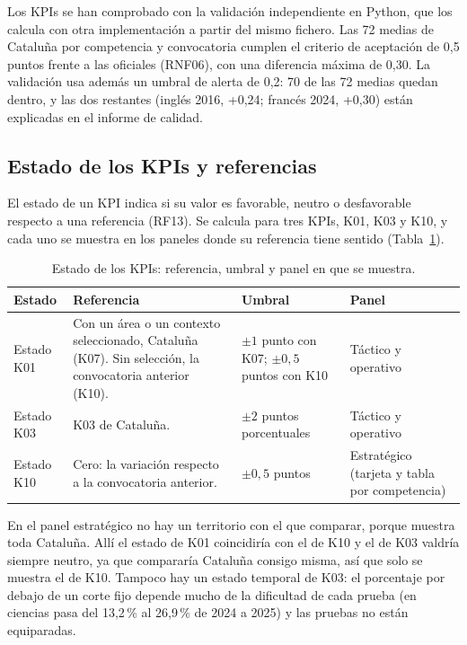 \documentclass[12pt, a4paper, oneside]{report}
\begin{document}
Los KPIs se han comprobado con la validación independiente en Python, que los calcula con otra implementación a partir del mismo fichero. Las 72 medias de Cataluña por competencia y convocatoria cumplen el criterio de aceptación de 0,5 puntos frente a las oficiales (RNF06), con una diferencia máxima de 0,30. La validación usa además un umbral de alerta de 0,2: 70 de las 72 medias quedan dentro, y las dos restantes (inglés 2016, +0,24; francés 2024, +0,30) están explicadas en el informe de calidad.

\subsection{Estado de los KPIs y referencias}
\label{sec:semaforos}
El estado de un KPI indica si su valor es favorable, neutro o desfavorable respecto a una referencia (RF13). Se calcula para tres KPIs, K01, K03 y K10, y cada uno se muestra en los paneles donde su referencia tiene sentido (Tabla~\ref{tab:semaforos}).

\begin{table}[H]
\centering
\small
{}\renewcommand{\arraystretch}{1.1}
\begin{tabularx}{\textwidth}{@{} >{\raggedright\arraybackslash}p{2.0cm} X >{\raggedright\arraybackslash}p{2.6cm} >{\raggedright\arraybackslash}p{3.2cm} @{}}
\toprule
\textbf{Estado} & \textbf{Referencia} & \textbf{Umbral} & \textbf{Panel} \\ \midrule
Estado K01 & Con un área o un contexto seleccionado, Cataluña (K07). Sin selección, la convocatoria anterior (K10). & $\pm 1$ punto con K07; $\pm 0{,}5$ puntos con K10 & Táctico y operativo \\ \addlinespace
Estado K03 & K03 de Cataluña. & $\pm 2$ puntos porcentuales & Táctico y operativo \\ \addlinespace
Estado K10 & Cero: la variación respecto a la convocatoria anterior. & $\pm 0{,}5$ puntos & Estratégico (tarjeta y tabla por competencia) \\ \bottomrule
\end{tabularx}
\caption{Estado de los KPIs: referencia, umbral y panel en que se muestra.}
\label{tab:semaforos}
\end{table}

En el panel estratégico no hay un territorio con el que comparar, porque muestra toda Cataluña. Allí el estado de K01 coincidiría con el de K10 y el de K03 valdría siempre neutro, ya que compararía Cataluña consigo misma, así que solo se muestra el de K10. Tampoco hay un estado temporal de K03: el porcentaje por debajo de un corte fijo depende mucho de la dificultad de cada prueba (en ciencias pasa del 13,2\,\% al 26,9\,\% de 2024 a 2025) y las pruebas no están equiparadas.
\end{document}
